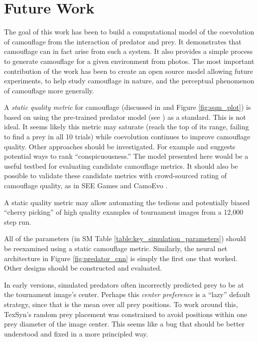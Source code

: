 \documentclass[letterpaper]{article}
\newcommand{\jargon}[1]{\textit{#1}}
\newcommand{\texsyn}[0]{TexSyn}
\begin{document}
\section{Future Work}
The goal of this work has been to build a computational model of the coevolution of camouflage from the interaction of predator and prey. It demonstrates that camouflage can in fact arise from such a system. It also provides a simple process to generate camouflage for a given environment from photos. The most important contribution of the work has been to create an open source model allowing future experiments, to help study camouflage in nature, and the perceptual phenomenon of camouflage more generally.
\par
A \jargon{static quality metric} for camouflage (discussed in  and Figure \ref{fig:sqm_plot}) is based on using the pre-trained predator model (see ) as a standard. This is not ideal. It seems likely this metric may saturate (reach the top of its range, failing to find a prey in all 10 trials) while coevolution continues to improve camouflage quality. Other approaches should be investigated. For example \citet{lv_cod_2022} and \citet{volonakis_camouflage_2018} suggests potential ways to rank “conspicuousness.” The model presented here would be a useful testbed for evaluating candidate camouflage metrics. It should also be possible to validate these candidate metrics with crowd-sourced rating of camouflage quality, as in SEE Games \citep{stevens_games_2022} and CamoEvo \citep{hancock_camoevo_2022}.
\par
A static quality metric may allow automating the tedious and potentially biased “cherry picking” of high quality examples of tournament images from a 12,000 step run.
\par
All of the parameters (in SM Table \ref{table:key_simulation_parameters}) should be reexamined using a static camouflage metric. Similarly, the neural net architecture in Figure \ref{fig:predator_cnn} is simply the first one that worked. Other designs should be constructed and evaluated.
\par
\par
In early versions, simulated predators often incorrectly predicted prey to be at the tournament image's center. Perhaps this \jargon{center preference} is a “lazy” default strategy, since that is the mean over all prey positions. To work around this, \texsyn{}'s random prey placement was constrained to avoid positions within one prey diameter of the image center. This seems like a bug that should be better understood and fixed in a more principled way.
\end{document}

